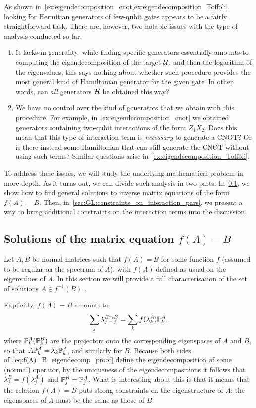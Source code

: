 As shown in~\cref{ex:eigendecomposition_cnot,ex:eigendecomposition_Toffoli}, looking for Hermitian generators of few-qubit gates appears to be a fairly straightforward task. There are, however, two notable issues with the type of analysis conducted so far:
\begin{enumerate}
    \item It lacks in generality: while finding specific generators essentially amounts to computing the eigendecomposition of the target ${\mathcal{U}}$, and then the logarithm of the eigenvalues, this says nothing about whether such procedure provides the most general kind of Hamiltonian generator for the given gate. In other words, can \textit{all} generators ${\mathcal{H}}$ be obtained this way?
    \item We have no control over the kind of generators that we obtain with this procedure. For example, in~\cref{ex:eigendecomposition_cnot} we obtained generators containing two-qubit interactions of the form $Z_1 X_2$. Does this mean that this type of interaction term is \textit{necessary} to generate a CNOT? Or is there instead some Hamiltonian that can still generate the CNOT without using such terms?
    Similar questions arise in~\cref{ex:eigendecomposition_Toffoli}.
\end{enumerate}
To address these issues, we will study the underlying mathematical problem in more depth. As it turns out, we can divide such analysis in two parts. In~\cref{sec:GL:solutions_matrix_equation_f(A)=B}, we show how to find general solutions to inverse matrix equations of the form $f(A)=B$. Then, in~\cref{sec:GL:constraints_on_interaction_pars}, we present a way to bring additional constraints on the interaction terms into the discussion.

\subsection{Solutions of the matrix equation \texorpdfstring{$f(A)=B$}{f(A)=B}}
\label{sec:GL:solutions_matrix_equation_f(A)=B}
Let $A,B$ be normal matrices such that $f(A)=B$ for some function $f$ (assumed to be regular on the spectrum of $A$), with $f(A)$ defined as usual on the eigenvalues of $A$.
In this section we will provide a full characterisation of the set of solutions $A\in f^{-1}(B)$ .

Explicitly, $f(A)=B$ amounts to
\begin{equation}
    \sum_j \lambda_j^B \mathbb{P}_j^B = \sum_k f(\lambda_k^A) \mathbb{P}_k^A,
    \label{eq:f(A)=B_eigendecomp_proof}
\end{equation}
where $\mathbb{P}_k^{A} (\mathbb{P}_k^{B})$ are the projectors onto the corresponding eigenspaces of $A$ and $B$, so that
$A\mathbb{P}_k^A=\lambda_k \mathbb{P}_k^A$, and similarly for $B$.
Because both sides of~\cref{eq:f(A)=B_eigendecomp_proof} define the eigendecomposition of some (normal) operator, by the uniqueness of the eigendecompositions it follows that $\lambda_j^B=f(\lambda_j^A)$ and $\mathbb{P}_j^B=\mathbb{P}_j^A$.
What is interesting about this is that it means that the relation $f(A)=B$ puts strong constraints on the eigenstructure of $A$: the eigenspaces of $A$ must be the same as those of $B$.

